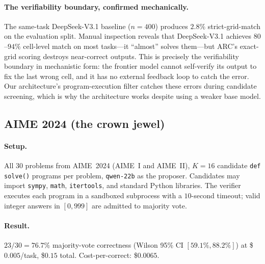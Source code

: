 \documentclass[11pt]{amsart}
\newcommand\1{{\mathds{1}}}
\theoremstyle{definition}
\theoremstyle{remark}
\numberwithin{equation}{section}
\begin{document}
\paragraph{The verifiability boundary, confirmed mechanically.}
The same-task DeepSeek-V3.1 baseline ($n\!=\!400$) produces $2.8\%$ strict-grid-match on the evaluation split.
Manual inspection reveals that DeepSeek-V3.1 achieves $80$--$94\%$ cell-level match on most tasks---it ``almost'' solves them---but ARC's exact-grid scoring destroys near-correct outputs.
This is precisely the verifiability boundary in mechanistic form: the frontier model cannot self-verify its output to fix the last wrong cell, and it has no external feedback loop to catch the error.
Our architecture's program-execution filter catches these errors during candidate screening, which is why the architecture works despite using a weaker base model.

\subsection{AIME 2024 (the crown jewel)}\label{sec:act2-aime}

\paragraph{Setup.}
All $30$ problems from AIME~2024 (AIME~I and AIME~II), $K\!=\!16$ candidate \texttt{def solve()} programs per problem, \texttt{qwen-22b} as the proposer.
Candidates may import \texttt{sympy}, \texttt{math}, \texttt{itertools}, and standard Python libraries.
The verifier executes each program in a sandboxed subprocess with a $10$-second timeout; valid integer answers in $[0, 999]$ are admitted to majority vote.

\paragraph{Result.}
$23/30 = 76.7\%$ majority-vote correctness (Wilson 95\% CI $[59.1\%, 88.2\%]$) at \$$0.005$/task, \$$0.15$ total.
Cost-per-correct: \$$0.0065$.
\end{document}
